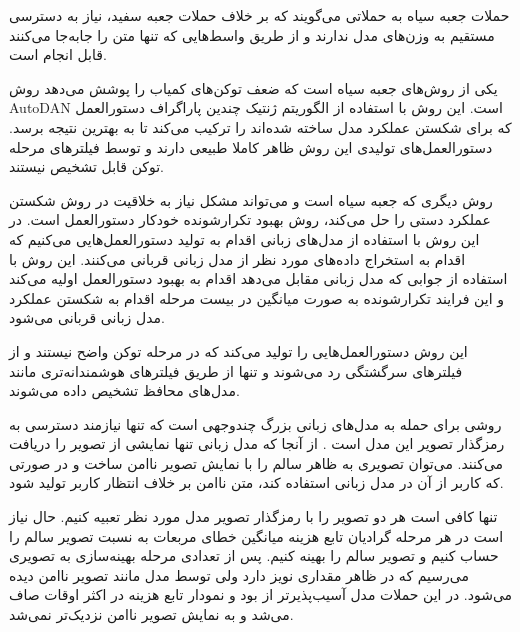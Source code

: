 
حملات جعبه سیاه به حملاتی می‌گویند که بر خلاف حملات جعبه سفید، نیاز به دسترسی مستقیم به وزن‌های مدل ندارند و از طریق واسط‌هایی که تنها متن را جابه‌جا می‌کنند قابل انجام است.

یکی از روش‌های جعبه سیاه است که ضعف توکن‌های کمیاب  را پوشش می‌دهد روش AutoDAN  است. این روش با استفاده از الگوریتم ژنتیک چندین پاراگراف دستورالعمل که برای شکستن عملکرد مدل ساخته شده‌اند را ترکیب می‌کند تا به بهترین نتیجه برسد. دستورالعمل‌های تولیدی این روش ظاهر کاملا طبیعی دارند و توسط فیلترهای مرحله توکن قابل تشخیص نیستند.

روش دیگری که جعبه سیاه است و می‌تواند مشکل نیاز به خلاقیت در روش شکستن عملکرد دستی را حل می‌کند، روش بهبود تکرارشونده خودکار دستورالعمل است. در این روش با استفاده از مدل‌های زبانی اقدام به تولید دستورالعمل‌هایی می‌کنیم که اقدام به استخراج داده‌های مورد نظر از مدل زبانی قربانی می‌کنند. این روش با استفاده از جوابی که مدل زبانی مقابل می‌دهد اقدام به بهبود دستورالعمل اولیه می‌کند و این فرایند تکرارشونده به صورت میانگین در بیست مرحله اقدام به شکستن عملکرد مدل زبانی قربانی می‌شود.

این روش دستورالعمل‌هایی را تولید می‌کند که در مرحله توکن واضح نیستند و از فیلترهای سرگشتگی رد می‌شوند و تنها از طریق فیلترهای هوشمندانه‌تری مانند مدل‌های محافظ تشخیص داده می‌شوند.



روشی برای حمله به مدل‌های زبانی بزرگ چندوجهی است که تنها نیازمند دسترسی به رمزگذار تصویر این مدل است . از آنجا که مدل زبانی تنها نمایشی از تصویر را دریافت می‌کنند. می‌توان تصویری به ظاهر سالم را با نمایش تصویر ناامن ساخت و در صورتی که کاربر از آن در مدل زبانی استفاده کند، متن ناامن بر خلاف انتظار کاربر تولید شود.



تنها کافی است هر دو تصویر را با رمزگذار تصویر مدل مورد نظر تعبیه کنیم. حال نیاز است در هر مرحله گرادیان تابع هزینه میانگین خطای مربعات به نسبت تصویر سالم را حساب کنیم و تصویر سالم را بهینه کنیم. پس از تعدادی مرحله بهینه‌سازی به تصویری می‌رسیم که در ظاهر مقداری نویز دارد ولی توسط مدل مانند تصویر ناامن دیده می‌شود. در این حملات مدل  آسیب‌پذیرتر از  بود و نمودار تابع هزینه  در اکثر اوقات صاف می‌شد و به نمایش تصویر ناامن نزدیک‌تر نمی‌شد.

